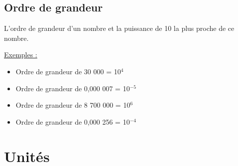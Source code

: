 \subsection{Ordre de grandeur}
\begin{tcolorbox}
[colback=green!5!white,colframe=green!75!black,title=\textbf{Ordre de grandeur d'un nombre}]
L'ordre de grandeur d'un nombre et la puissance de 10 la plus proche de ce nombre.
\end{tcolorbox}
\underline{Exemples :}
\begin{itemize}
    \item Ordre de grandeur de 30 000 = 10$^4$
    \item Ordre de grandeur de 0,000 007 = 10$^{-5}$
    \item Ordre de grandeur de 8 700 000 = 10$^6$
    \item Ordre de grandeur de 0,000 256 = 10$^{-4}$
\end{itemize}

\section{Unités}
